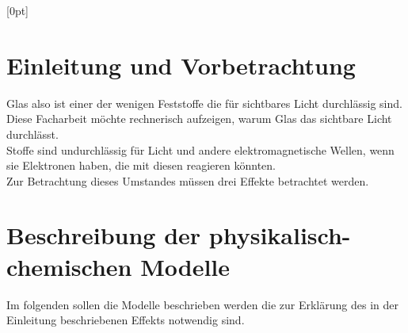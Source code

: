 \documentclass[11pt,a4paper,oneside]{report}
\begin{document}
\titlespacing{\chapter}{0em}{1em}{1.5em}[0pt]
\renewcommand{\contentsname}{Inhaltsverzeichnis}
\renewcommand{\bibname}{Quellen}

\pagestyle{fancy}
\fancyhf{}
\fancyhead[CEO]{\thepage}
\renewcommand{\headrulewidth}{0pt}

\setcounter{page}{2}


\tableofcontents

\clearpage

\chapter{Einleitung und Vorbetrachtung}

Glas also  ist einer der wenigen Feststoffe die für sichtbares Licht durchlässig sind. Diese Facharbeit möchte rechnerisch aufzeigen, warum Glas das sichtbare Licht durchlässt.
\\Stoffe sind undurchlässig für Licht und andere elektromagnetische Wellen, wenn sie Elektronen haben, die mit diesen reagieren könnten.
\\Zur Betrachtung dieses Umstandes müssen drei Effekte betrachtet werden. \cite{pape99}

\chapter{Beschreibung der physikalisch-chemischen Modelle}
Im folgenden sollen die Modelle beschrieben werden die zur Erklärung des in der Einleitung beschriebenen Effekts notwendig sind.
\end{document}
